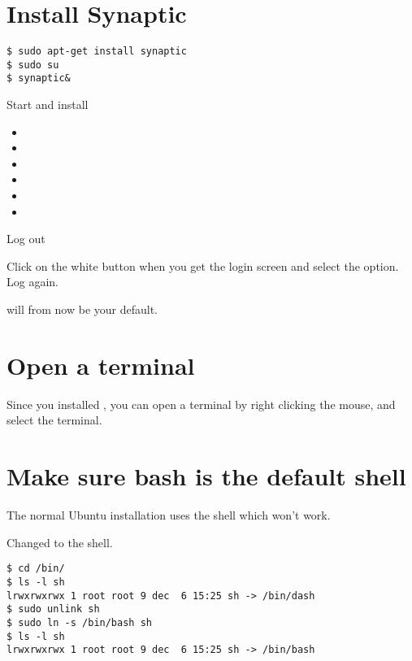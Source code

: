 
\section{Install Synaptic}

\begin{verbatim}
$ sudo apt-get install synaptic
$ sudo su
$ synaptic&
\end{verbatim}

Start  and install 


\begin{itemize}

\item {}

\item {}

\item {}

\item {}

\item {}

\item {}

\end{itemize}

Log out

Click on the white  button when you get the login screen
and select the  option. Log again.

 will from now be your default.

\section{Open a terminal}

Since you installed , you can open a terminal
by right clicking the mouse, and select the terminal.


\section{Make sure bash is the default shell}

The normal Ubuntu installation uses the  shell which won't work.

Changed to the  shell.

\begin{verbatim}
$ cd /bin/
$ ls -l sh
lrwxrwxrwx 1 root root 9 dec  6 15:25 sh -> /bin/dash
$ sudo unlink sh
$ sudo ln -s /bin/bash sh
$ ls -l sh
lrwxrwxrwx 1 root root 9 dec  6 15:25 sh -> /bin/bash
\end{verbatim}


